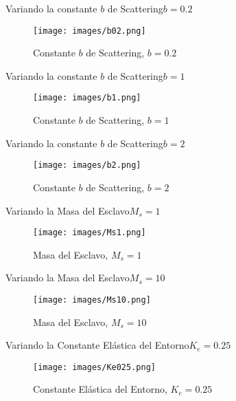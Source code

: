 \documentclass{beamer}
\begin{document}
\begin{frame}{Variando la constante $b$ de Scattering}{$b=0.2$}
	
	\begin{figure}[h!]
		\centering
		\texttt{[image: images/b02.png]}
		\caption{Constante $b$ de Scattering, $b=0.2$}
		\label{B02}
	\end{figure}
	
\end{frame}

\begin{frame}{Variando la constante $b$ de Scattering}{$b=1$}
	
	\begin{figure}[h!]
		\centering
		\texttt{[image: images/b1.png]}
		\caption{Constante $b$ de Scattering, $b=1$}
		\label{B1}
	\end{figure}
	
\end{frame}

\begin{frame}{Variando la constante $b$ de Scattering}{$b=2$}
	
	\begin{figure}[h!]
		\centering
		\texttt{[image: images/b2.png]}
		\caption{Constante $b$ de Scattering, $b=2$}
		\label{B2}
	\end{figure}
	
\end{frame}

\begin{frame}{Variando la Masa del Esclavo}{$M_s=1$}
	
	\begin{figure}[h!]
		\centering
		\texttt{[image: images/Ms1.png]}
		\caption{Masa del Esclavo, $M_s=1$}
		\label{MS1}
	\end{figure}
	
\end{frame}

\begin{frame}{Variando la Masa del Esclavo}{$M_s=10$}

\begin{figure}[h!]
	\centering
	\texttt{[image: images/Ms10.png]}
	\caption{Masa del Esclavo, $M_s=10$}
	\label{MS10}
\end{figure}

\end{frame}

\begin{frame}{Variando la Constante Elástica del Entorno}{$K_e=0.25$}
	
	\begin{figure}[h!]
		\centering
		\texttt{[image: images/Ke025.png]}
		\caption{Constante Elástica del Entorno, $K_e=0.25$}
		\label{KE025}
	\end{figure}
	
\end{frame}
\end{document}
